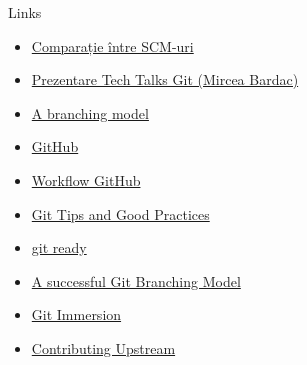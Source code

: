 \documentclass{beamer}
\begin{document}
\begin{frame}[label=l]{Links}
  \begin{itemize}
    \item \href{http://en.wikipedia.org/wiki/Comparison_of_revision_control_software}{Comparație între SCM-uri}
    \item \href{http://talks.rosedu.org/prezentari/prezentarea03}{Prezentare
    Tech Talks Git (Mircea Bardac)}
    \item \href{http://nvie.com/posts/a-successful-git-branching-model/}{A
    branching model}
    \item \href{http://github.com}{GitHub}
    \item
    \href{http://www.eqqon.com/index.php/Collaborative_Github_Workflow}{Workflow
    GitHub}
    \item
    \href{http://techblog.rosedu.org/git-good-practices.html}{Git Tips and
    Good Practices}
    \item
    \href{http://gitready.com/}{git ready}
    \item
    \href{http://nvie.com/posts/a-successful-git-branching-model/}{A
    successful Git Branching Model}
    \item
    \href{http://gitimmersion.com/}{Git Immersion}
    \item
    \href{http://techblog.rosedu.org/contributing-upstream.html}{Contributing
    Upstream}
  \end{itemize}
\end{frame}
\end{document}
